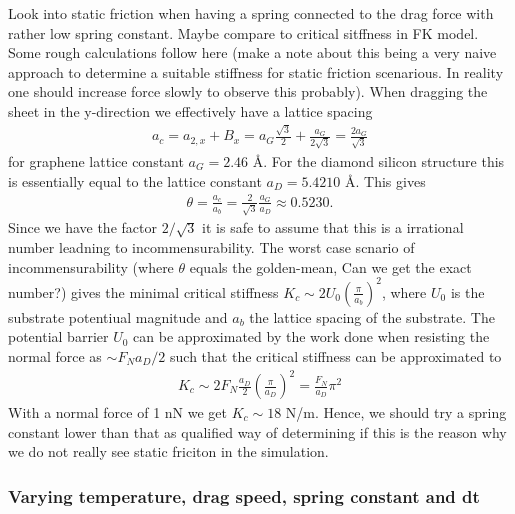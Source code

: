 Look into static friction when having a spring connected to the drag force with
rather low spring constant. Maybe compare to critical sitffness in FK model.
Some rough calculations follow here (make a note about this being a very naive
approach to determine a suitable stiffness for static friction scenarious. In
reality one should increase force slowly to observe this probably). When
dragging the sheet in the y-direction we effectively have a lattice spacing
\begin{align*}
  a_c = a_{2,x} + B_x = a_G\frac{\sqrt{3}}{2} + \frac{a_G}{2\sqrt{3}} = \frac{2a_G}{\sqrt{3}}
\end{align*}
for graphene lattice constant $a_G = 2.46$ Å. For the diamond silicon structure
this is essentially equal to the lattice constant $a_D = 5.4210$ Å. This gives 
\begin{align*}
  \theta = \frac{a_c}{a_b} = \frac{2}{\sqrt{3}}\frac{a_G}{a_D} \approx 0.5230.
\end{align*}
Since we have the factor $2/\sqrt{3}$ it is safe to assume that this is a
irrational number leadning to incommensurability. The worst case scnario of
incommensurability (where $\theta$ equals the golden-mean, Can we get the exact
number?) gives the minimal critical stiffness $K_c \sim 2U_0
(\frac{\pi}{a_b})^2$, where $U_0$ is the substrate potentiual magnitude and
$a_b$ the lattice spacing of the substrate. The potential barrier $U_0$ can be
approximated by the work done when resisting the normal force as $\sim F_N
a_D/2$ such that the critical stiffness can be approximated to 
\begin{align*}
  K_c \sim 2 F_N \frac{a_D}{2} \left(\frac{\pi}{a_D}\right)^2 = \frac{F_N}{a_D}\pi^2
\end{align*}
With a normal force of 1 nN we get $K_c \sim 18$ N/m. Hence, we should try a
spring constant lower than that as qualified way of determining if this is the
reason why we do not really see static friciton in the simulation. 



\newpage
\subsubsection{Varying temperature, drag speed, spring constant and dt}


